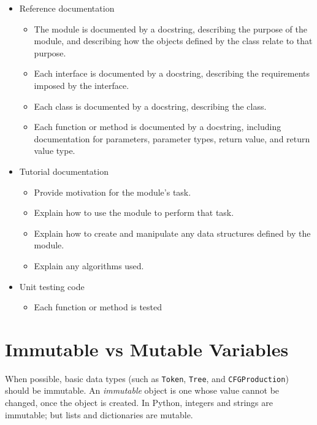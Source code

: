 \documentclass{article}
\begin{document}
\begin{itemize}
\item Reference documentation
  \begin{itemize}
  \item The module is documented by a docstring, describing the
    purpose of the module, and describing how the objects defined by
    the class relate to that purpose.
  \item Each interface is documented by a docstring, describing the
    requirements imposed by the interface.
  \item Each class is documented by a docstring, describing the class.
  \item Each function or method is documented by a docstring,
    including documentation for parameters, parameter types, return
    value, and return value type.
  \end{itemize}
\item Tutorial documentation
  \begin{itemize}
  \item Provide motivation for the module's task.
  \item Explain how to use the module to perform that task.
  \item Explain how to create and manipulate any data structures
    defined by the module.
  \item Explain any algorithms used.
  \end{itemize}

\item Unit testing code
  \begin{itemize}
  \item Each function or method is tested
  \end{itemize}
\end{itemize}

\section{Immutable vs Mutable Variables}

When possible, basic data types (such as \texttt{Token},
\texttt{Tree}, and \texttt{CFGProduction}) should be immutable.  An
\textit{immutable} object is one whose value cannot be changed, once
the object is created.  In Python, integers and strings are immutable;
but lists and dictionaries are mutable.
\end{document}
